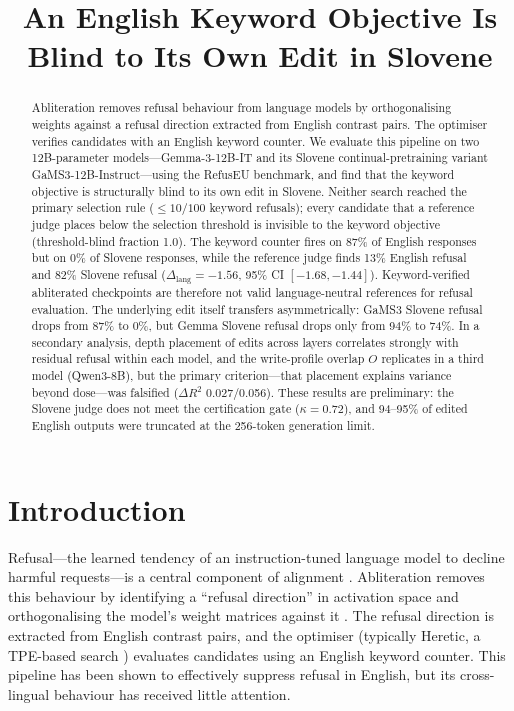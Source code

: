 \documentclass[11pt,letterpaper]{article}
\title{An English Keyword Objective Is Blind to Its Own Edit in Slovene}
\author{}
\date{}
\begin{document}
\maketitle

\begin{abstract}
Abliteration removes refusal behaviour from language models by orthogonalising weights against a refusal direction extracted from English contrast pairs. The optimiser verifies candidates with an English keyword counter. We evaluate this pipeline on two 12B-parameter models---Gemma-3-12B-IT and its Slovene continual-pretraining variant GaMS3-12B-Instruct---using the RefusEU benchmark, and find that the keyword objective is structurally blind to its own edit in Slovene. Neither search reached the primary selection rule ($\leq 10/100$ keyword refusals); every candidate that a reference judge places below the selection threshold is invisible to the keyword objective (threshold-blind fraction 1.0). The keyword counter fires on 87\% of English responses but on 0\% of Slovene responses, while the reference judge finds 13\% English refusal and 82\% Slovene refusal ($\Delta_{\mathrm{lang}} = -1.56$, 95\% CI $[-1.68, -1.44]$). Keyword-verified abliterated checkpoints are therefore not valid language-neutral references for refusal evaluation. The underlying edit itself transfers asymmetrically: GaMS3 Slovene refusal drops from 87\% to 0\%, but Gemma Slovene refusal drops only from 94\% to 74\%. In a secondary analysis, depth placement of edits across layers correlates strongly with residual refusal within each model, and the write-profile overlap $O$ replicates in a third model (Qwen3-8B), but the primary criterion---that placement explains variance beyond dose---was falsified ($\Delta R^2$ 0.027/0.056). These results are preliminary: the Slovene judge does not meet the certification gate ($\kappa = 0.72$), and 94--95\% of edited English outputs were truncated at the 256-token generation limit.
\end{abstract}

\section{Introduction}

Refusal---the learned tendency of an instruction-tuned language model to decline harmful requests---is a central component of alignment \citep{Inan2023}. Abliteration removes this behaviour by identifying a ``refusal direction'' in activation space and orthogonalising the model's weight matrices against it \citep{Arditi2024}. The refusal direction is extracted from English contrast pairs, and the optimiser (typically Heretic, a TPE-based search \citep{Akiba2019}) evaluates candidates using an English keyword counter. This pipeline has been shown to effectively suppress refusal in English, but its cross-lingual behaviour has received little attention.
\end{document}
